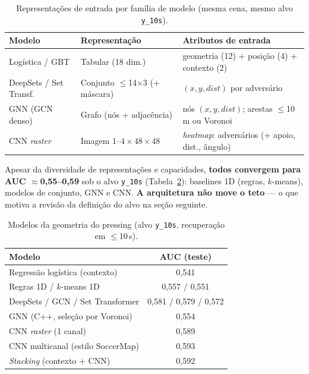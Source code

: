 \documentclass[a4paper,11pt]{article}
\begin{document}
\begin{table}[ht]
\centering
\caption{Representações de entrada por família de modelo (mesma cena, mesmo alvo \texttt{y\_10s}).}
\label{tab:repr}
\begin{tabular}{lll}
\toprule
Modelo & Representação & Atributos de entrada \\
\midrule
Logística / GBT & Tabular (18 dim.) & geometria (12) + posição (4) + contexto (2) \\
DeepSets / Set Transf. & Conjunto $\le$14$\times$3 (+ máscara) & $(x,y,\mathit{dist})$ por adversário \\
GNN (GCN denso) & Grafo (nós + adjacência) & nós $(x,y,\mathit{dist})$; arestas $\le$10\,m ou Voronoi \\
CNN \emph{raster} & Imagem $1$--$4\times48\times48$ & \emph{heatmap}: adversários (+ apoio, dist., ângulo) \\
\bottomrule
\end{tabular}
\end{table}

\noindent Apesar da diversidade de representações e capacidades, \textbf{todos convergem para AUC $\approx$0,55--0,59} sob o alvo \texttt{y\_10s} (Tabela~\ref{tab:plateau}): baselines 1D (regras, $k$-means), modelos de conjunto, GNN e CNN. \textbf{A arquitetura não move o teto} --- o que motiva a revisão da definição do alvo na seção seguinte.

\begin{table}[ht]
\centering
\caption{Modelos da geometria do pressing (alvo \texttt{y\_10s}, recuperação em $\le$10\,s).}
\label{tab:plateau}
\begin{tabular}{lc}
\toprule
Modelo & AUC (teste) \\
\midrule
Regressão logística (contexto) & 0,541 \\
Regras 1D / $k$-means 1D & 0,557 / 0,551 \\
DeepSets / GCN / Set Transformer & 0,581 / 0,579 / 0,572 \\
GNN (C++, seleção por Voronoi) & 0,554 \\
CNN \emph{raster} (1 canal) & 0,589 \\
CNN multicanal (estilo SoccerMap) & 0,593 \\
\emph{Stacking} (contexto + CNN) & 0,592 \\
\bottomrule
\end{tabular}
\end{table}
\end{document}
